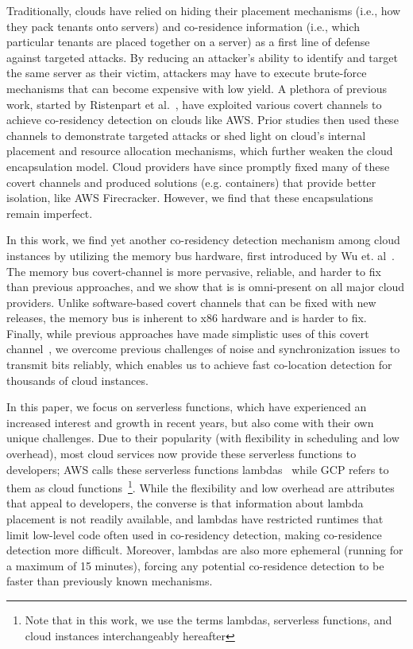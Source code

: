 Traditionally, clouds have relied on hiding their placement mechanisms (i.e.,
how they pack tenants onto servers) and co-residence information (i.e., which
particular tenants are placed together on a server) as a first line of defense
against targeted attacks. By reducing an attacker's ability to identify and
target the same server as their victim, attackers may have to execute
brute-force mechanisms that can become expensive with low yield.  A plethora of
previous work, started by Ristenpart et al.~\cite{ristenpartccs2009}, have
exploited various covert channels to achieve co-residency detection on clouds
like AWS. Prior studies then used these channels to demonstrate targeted attacks
or shed light on cloud's internal placement and resource allocation
mechanisms, which further weaken the cloud encapsulation model. Cloud
providers have since promptly fixed many of these covert channels and produced
solutions (e.g. containers) that provide better isolation, like AWS
Firecracker\cite{firecracker}. However, we find that these encapsulations remain
imperfect.


In this work, we find yet another co-residency detection mechanism among cloud
instances by utilizing the memory bus hardware, first introduced by Wu et.
al~\cite{wuusenix2012}.  The memory bus covert-channel is more pervasive,
reliable, and harder to fix than previous approaches, and we show that is is
omni-present on all major cloud providers. Unlike software-based covert channels
that can be fixed with new releases, the memory bus is inherent to x86 hardware
and is harder to fix.  Finally, while previous approaches have made simplistic
uses of this covert channel~\cite{varadarajan2015}, we overcome previous
challenges of noise and synchronization issues to transmit bits reliably, which
enables us to achieve fast co-location detection for thousands of cloud
instances.

In this paper, we focus on serverless functions, which have experienced an
increased interest and growth in recent years, but also come with their own
unique challenges. Due to their popularity (with flexibility in scheduling and
low overhead), most cloud services now provide these serverless functions to
developers; AWS calls these serverless functions lambdas~\cite{awslambda} while
GCP refers to them as cloud functions~\cite{gcpfunctions}\footnote{Note that in
this work, we use the terms lambdas, serverless functions, and cloud instances
interchangeably hereafter}.  While the flexibility and low overhead are
attributes that appeal to developers, the converse is that information about
lambda placement is not readily available, and lambdas have restricted runtimes
that limit low-level code often used in co-residency detection, making
co-residence detection more difficult. Moreover, lambdas are also more ephemeral
(running for a maximum of 15 minutes), forcing any potential co-residence
detection to be faster than previously known mechanisms. 

